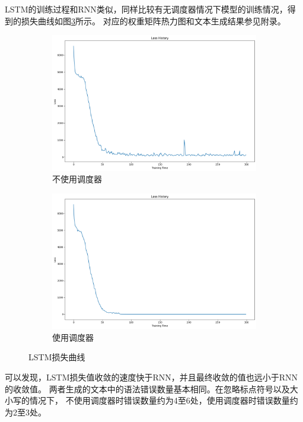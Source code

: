     LSTM的训练过程和RNN类似，同样比较有无调度器情况下模型的训练情况，得到的损失曲线如图\ref{fig:lstmlosshistory}所示。
    对应的权重矩阵热力图和文本生成结果参见附录。

    \begin{figure}[H]
        \centering
        \begin{subfigure}{0.45\textwidth}
            \includegraphics[width=\linewidth]{../output/lstm/no scheduler/lstm_loss.png}
            \caption{不使用调度器}
            \label{fig:LSTMlosshistorynoscheduler}
        \end{subfigure}
        \hfill
        \begin{subfigure}{0.45\textwidth}
            \includegraphics[width=\linewidth]{../output/lstm/with scheduler/lstm_loss.png}
            \caption{使用调度器}
            \label{fig:LSTMlosshistorywithscheduler}
        \end{subfigure}
        \caption{LSTM损失曲线}
        \label{fig:lstmlosshistory}
    \end{figure}

    可以发现，LSTM损失值收敛的速度快于RNN，并且最终收敛的值也远小于RNN的收敛值。
    两者生成的文本中的语法错误数量基本相同。在忽略标点符号以及大小写的情况下，
    不使用调度器时错误数量约为4至6处，使用调度器时错误数量约为2至3处。